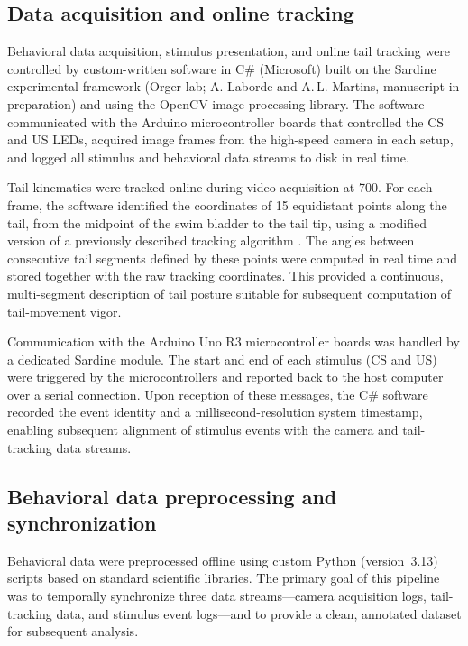 \subsection{Data acquisition and online tracking}

Behavioral data acquisition, stimulus presentation, and online tail tracking were controlled by custom-written software in C\# (Microsoft) built on the Sardine experimental framework (Orger lab; A. Laborde and A.\,L. Martins, manuscript in preparation) and using the OpenCV image-processing library. The software communicated with the Arduino microcontroller boards that controlled the CS and US LEDs, acquired image frames from the high-speed camera in each setup, and logged all stimulus and behavioral data streams to disk in real time.

Tail kinematics were tracked online during video acquisition at \SI{700}{\fps}. For each frame, the software identified the coordinates of 15 equidistant points along the tail, from the midpoint of the swim bladder to the tail tip, using a modified version of a previously described tracking algorithm \citep{Marques2018}. The angles between consecutive tail segments defined by these points were computed in real time and stored together with the raw tracking coordinates. This provided a continuous, multi-segment description of tail posture suitable for subsequent computation of tail-movement vigor.

Communication with the Arduino Uno R3 microcontroller boards was handled by a dedicated Sardine module. The start and end of each stimulus (CS and US) were triggered by the microcontrollers and reported back to the host computer over a serial connection. Upon reception of these messages, the C\# software recorded the event identity and a millisecond-resolution system timestamp, enabling subsequent alignment of stimulus events with the camera and tail-tracking data streams.

\subsection{Behavioral data preprocessing and synchronization}

Behavioral data were preprocessed offline using custom Python (version~3.13) scripts based on standard scientific libraries. The primary goal of this pipeline was to temporally synchronize three data streams---camera acquisition logs, tail-tracking data, and stimulus event logs---and to provide a clean, annotated dataset for subsequent analysis.

